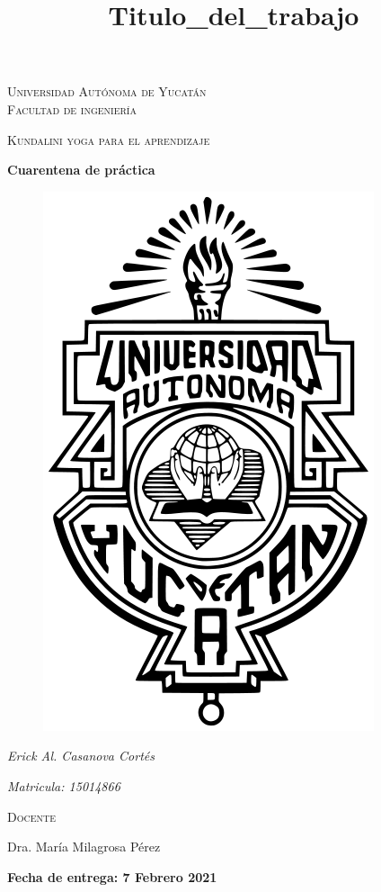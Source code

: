 \documentclass[11pt]{report}
\theoremstyle{plain}
\theoremstyle{definition}
\begin{document}
\begin{titlepage}
\title{Titulo_del_trabajo}


	\centering
	{\scshape\LARGE Universidad Autónoma de Yucatán  \\ Facultad de ingeniería\par}
	\vspace{1cm}
	{\scshape\Large Kundalini yoga para el aprendizaje\par}
	\vspace{1.5cm}
	{\huge\bfseries Cuarentena de práctica\par}
	\vspace{0.7cm}
	{\begin{figure}[!h]
	\centering
    \includegraphics[scale=0.3]{UADY.png}
	\end{figure}}
	\vspace{0.7cm}
	{\Large\itshape Erick Al. Casanova Cortés\par}
	{\Large\itshape Matricula: 15014866\par}
	\vfill
	{\scshape\Large Docente\par
	Dra. María Milagrosa Pérez\par}
	\vfill
	{\Large{\bfseries Fecha de entrega: 7 Febrero 2021} }

	\vfill
	
\end{titlepage}
\end{document}
